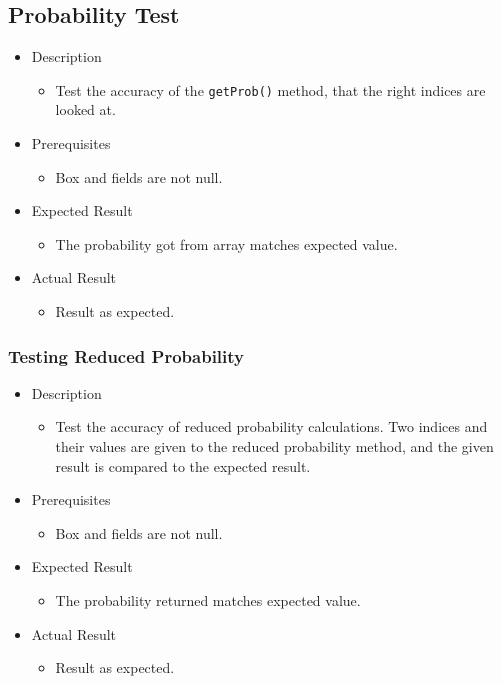 \documentclass[report.tex]{subfiles}
\begin{document}
\subsection{Probability Test} %
\label{sub:probability_test}
\begin{itemize}
    \item Description
    \begin{itemize}
        \item Test the accuracy of the \texttt{getProb()} method, that the right
        indices are looked at.
    \end{itemize}
    \item Prerequisites
    \begin{itemize}
        \item Box and fields are not null.
    \end{itemize}
    \item Expected Result
    \begin{itemize}
        \item The probability got from array matches expected value.
    \end{itemize}
    \item Actual Result
    \begin{itemize}
        \item Result as expected.
    \end{itemize}
\end{itemize}

\subsubsection{Testing Reduced Probability} %
\label{ssub:testing_reduced_probability}
\begin{itemize}
    \item Description
    \begin{itemize}
        \item Test the accuracy of reduced probability calculations. Two
        indices and their values are given to the reduced probability method,
        and the given result is compared to the expected result.
    \end{itemize}
    \item Prerequisites
    \begin{itemize}
        \item Box and fields are not null.
    \end{itemize}
    \item Expected Result
    \begin{itemize}
        \item The probability returned matches expected value.
    \end{itemize}
    \item Actual Result
    \begin{itemize}
        \item Result as expected.
    \end{itemize}
\end{itemize}
\end{document}
